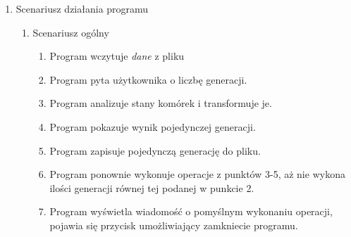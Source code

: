 \documentclass[11pt]{article}
\begin{document}
\begin{enumerate}
\item Scenariusz działania programu


\begin{enumerate}[label=\arabic{enumi}.\arabic*.]
\item Scenariusz ogólny
\begin{enumerate}[label*=\arabic*.]
\item Program wczytuje \textit{dane} z pliku 
\item Program pyta użytkownika o liczbę generacji.
\item Program analizuje stany komórek i transformuje je.
\item Program pokazuje wynik pojedynczej generacji.
\item Program zapisuje pojedynczą generację do pliku.
\item Program ponownie wykonuje operacje z punktów 3-5, aż nie wykona ilości generacji równej tej 		podanej w punkcie 2.
\item Program wyświetla wiadomość o pomyślnym wykonaniu operacji, pojawia się przycisk umożliwiający zamkniecie programu.\\
\end{enumerate}




\end{enumerate}
\end{enumerate}
\end{document}
